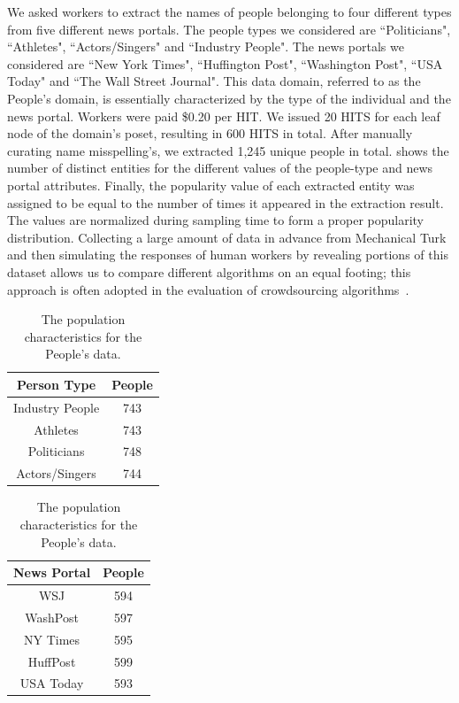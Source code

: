 We asked workers to extract the names of people belonging to four different types from five different news portals. The people types we considered are ``Politicians", ``Athletes", ``Actors/Singers" and ``Industry People". The news portals we considered are ``New York Times", ``Huffington Post", ``Washington Post", ``USA  Today" and ``The Wall Street Journal". This data domain, referred to as the People's domain, is essentially characterized by the type of the individual and the news portal. Workers were paid \$0.20 per HIT. We issued 20 HITS for each leaf node of the domain's poset, resulting in 600 HITS in total. After manually curating name misspelling's, we extracted 1,245 unique people in total.  shows the number of distinct entities for the different values of the people-type and news portal attributes. Finally, the popularity value of each extracted entity was assigned to be equal to the number of times it appeared in the extraction result. The values are normalized during sampling time to form a proper popularity distribution. Collecting a large amount of data in advance from Mechanical Turk and then simulating the responses of human workers by revealing portions of this dataset allows us to compare different algorithms on an equal footing; this approach is often adopted in the evaluation of crowdsourcing algorithms~\cite{DBLP:journals/pvldb/ParameswaranBG0PW14, marcus:2011,trushkowsky:2013}.

\begin{table}
\scriptsize\center
\caption{The population characteristics for the People's data.}
\label{tab:ptypedata}
\begin{tabular}{|c|c|}
\hline
\textbf{Person Type} & \textbf{People} \\ \hline
Industry People & 743 \\
Athletes & 743 \\
Politicians & 748 \\
Actors/Singers & 744 \\ \hline
\end{tabular}
\quad
\begin{tabular}{|c|c|}
\hline
\textbf{News Portal} & \textbf{People} \\ \hline
WSJ & 594 \\
WashPost & 597 \\
NY Times & 595 \\
HuffPost & 599 \\
USA Today & 593 \\ \hline
\end{tabular}
\vspace{-15pt}
\end{table}


